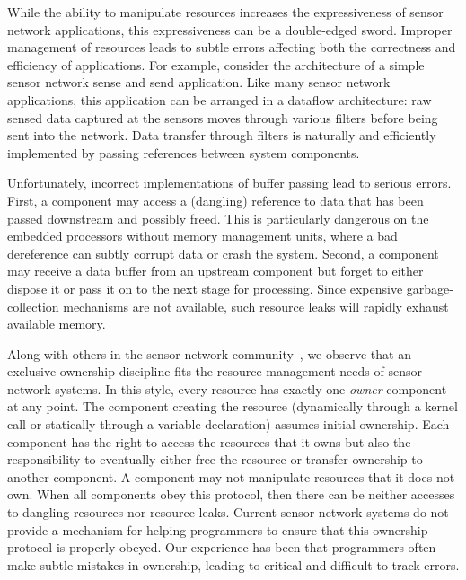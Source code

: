 While the ability to manipulate resources increases the expressiveness of
sensor network applications, this expressiveness can be a double-edged
sword.  
%
Improper management of resources leads to subtle errors affecting both the
correctness and efficiency of applications.
%
For example, consider the architecture of a simple sensor network sense and
send application.  
%
Like many sensor network applications, this application can be arranged in
a dataflow architecture:  raw sensed data captured at the sensors moves
through various filters before being sent into the network.  
%
Data transfer through filters is naturally and efficiently implemented by
passing references between system components.



Unfortunately, incorrect implementations of buffer passing lead to serious
errors.  
%
First, a component may access a (dangling) reference to data that has been
passed downstream and possibly freed.
%
This is particularly dangerous on the embedded processors without memory
management units, where a bad dereference can subtly corrupt data or crash
the system. 
%
Second, a component may receive a data buffer from an upstream component but
forget to either dispose it or pass it on to the next stage for processing.
%
Since expensive garbage-collection mechanisms are not available, such
resource leaks will rapidly exhaust available memory.



Along with others in the sensor network community~\cite{archer07interface}, we
observe that an exclusive ownership discipline fits the resource management 
needs of sensor network systems.
%
In this style, every resource has exactly one {\em owner} component at any
point.  
%
The component creating the resource (dynamically through a kernel call or
statically through a variable declaration) assumes initial ownership.  
%
Each component has the right to access the resources that it owns but also
the responsibility to eventually either free the resource or transfer
ownership to another component.  
%
A component may not manipulate resources that it does not own.  
%
When all components obey this protocol, then there can be neither accesses
to dangling resources nor resource leaks.
%
Current sensor network systems do not provide a mechanism for helping
programmers to ensure that this ownership protocol is properly obeyed.  
%
Our experience has been that programmers often make subtle mistakes in
ownership, leading to critical and difficult-to-track errors.  



